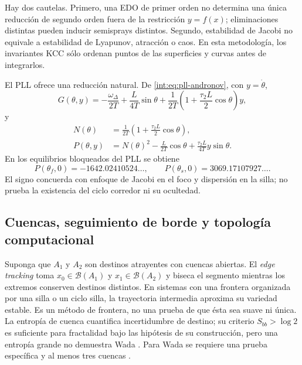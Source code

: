 Hay dos cautelas. Primero, una EDO de primer orden no determina una única
reducción de segundo orden fuera de la restricción $y=f(x)$; eliminaciones
distintas pueden inducir semisprays distintos. Segundo, estabilidad de Jacobi
no equivale a estabilidad de Lyapunov, atracción o caos. En esta metodología,
los invariantes KCC sólo ordenan puntos de las superficies y curvas antes de
integrarlos.

El PLL ofrece una reducción natural. De
\cref{int:eq:pll-andronov}, con $y=\dot\theta$,
\begin{equation}
 G(\theta,y)=
 -\frac{\omega_\Delta}{2T}+\frac{L}{4T}\sin\theta
 +\frac{1}{2T}\left(1+\frac{\tau_2L}{2}\cos\theta\right)y,
 \label{gt:eq:pll-kcc-G}
\end{equation}
y
\begin{align}
 N(\theta)&=\frac{1}{2T}
 \left(1+\frac{\tau_2L}{2}\cos\theta\right),\\
 P(\theta,y)&=N(\theta)^2-\frac{L}{2T}\cos\theta
 +\frac{\tau_2L}{4T}y\sin\theta.
 \label{gt:eq:pll-kcc-P}
\end{align}
En los equilibrios bloqueados del PLL se obtiene
\begin{equation}
 P(\theta_f,0)=-1642.02410524\ldots,
 \qquad
 P(\theta_s,0)=3069.17107927\ldots.
 \label{gt:eq:pll-kcc-values}
\end{equation}
El signo concuerda con enfoque de Jacobi en el foco y dispersión en la silla;
no prueba la existencia del ciclo corredor ni su ocultedad.

\ifHAFOBasinMaterial
\subsection{Cuencas, seguimiento de borde y topología computacional}
\label{subsec:gt-set-oriented}

Suponga que $A_1$ y $A_2$ son destinos atrayentes con cuencas abiertas. El
\emph{edge tracking} toma $x_0\in\mathcal B(A_1)$ y
$x_1\in\mathcal B(A_2)$ y biseca el segmento mientras los extremos conserven
destinos distintos. En sistemas con una frontera organizada por una silla o
un ciclo silla, la trayectoria intermedia aproxima su variedad estable. Es un
método de frontera, no una prueba de que ésta sea suave ni única. La entropía
de cuenca cuantifica incertidumbre de destino; su criterio $S_{bb}>\log2$ es
suficiente para fractalidad bajo las hipótesis de su construcción, pero una
entropía grande no demuestra Wada \cite{DazaEtAl2016BasinEntropy}. Para Wada
se requiere una prueba específica y al menos tres cuencas
\cite{DazaEtAl2015Wada}.

